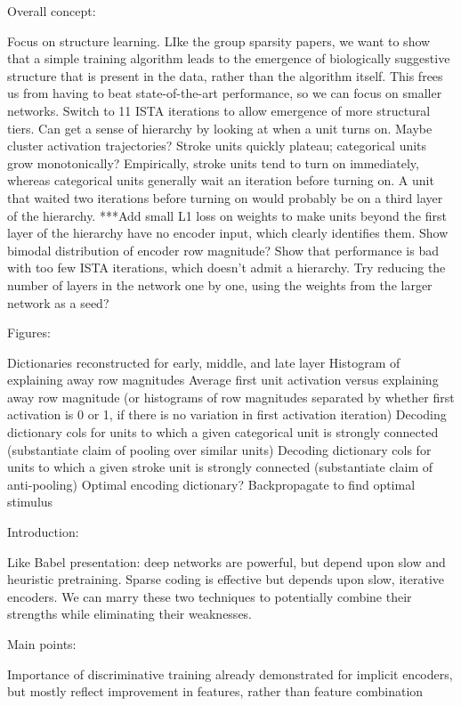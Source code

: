 Overall concept:

Focus on structure learning.  LIke the group sparsity papers, we want to show that a simple training algorithm leads to the emergence of biologically suggestive structure that is present in the data, rather than the algorithm itself.  This frees us from having to beat state-of-the-art performance, so we can focus on smaller networks.  
Switch to 11 ISTA iterations to allow emergence of more structural tiers.  
Can get a sense of hierarchy by looking at when a unit turns on.  Maybe cluster activation trajectories?  Stroke units quickly plateau; categorical units grow monotonically?  Empirically, stroke units tend to turn on immediately, whereas categorical units generally wait an iteration before turning on.  A unit that waited two iterations before turning on would probably be on a third layer of the hierarchy.  
***Add small L1 loss on weights to make units beyond the first layer of the hierarchy have no encoder input, which clearly identifies them.  Show bimodal distribution of encoder row magnitude?
Show that performance is bad with too few ISTA iterations, which doesn't admit a hierarchy.  Try reducing the number of layers in the network one by one, using the weights from the larger network as a seed?



Figures:

Dictionaries reconstructed for early, middle, and late layer
Histogram of explaining away row magnitudes
Average first unit activation versus explaining away row magnitude (or histograms of row magnitudes separated by whether first activation is 0 or 1, if there is no variation in first activation iteration)
Decoding dictionary cols for units to which a given categorical unit is strongly connected (substantiate claim of pooling over similar units)
Decoding dictionary cols for units to which a given stroke unit is strongly connected (substantiate claim of anti-pooling)
Optimal encoding dictionary?
Backpropagate to find optimal stimulus


Introduction:

Like Babel presentation: deep networks are powerful, but depend upon slow and heuristic pretraining.  Sparse coding is effective but depends upon slow, iterative encoders.  We can marry these two techniques to potentially combine their strengths while eliminating their weaknesses.




Main points:

Importance of discriminative training already demonstrated for implicit encoders, but mostly reflect improvement in features, rather than feature combination
 
